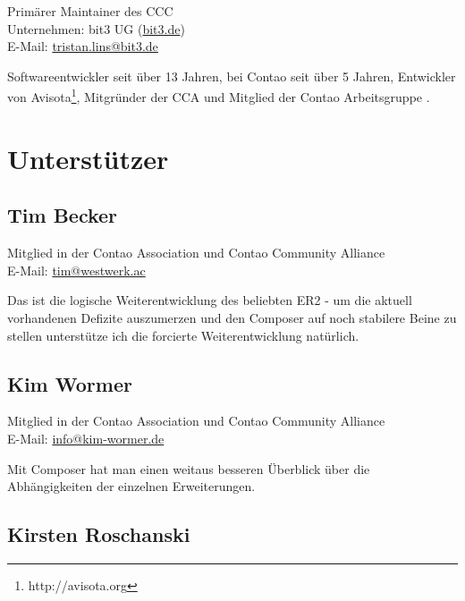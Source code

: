 \documentclass[
paper=a4,
draft=false,%
fontsize=10pt%
]{scrartcl}
\begin{document}
Primärer Maintainer des CCC \\
Unternehmen: bit3 UG (\href{https://bit3.de}{bit3.de}) \\
E-Mail: \href{mailto:tristan.lins@bit3.de}{tristan.lins@bit3.de}

Softwareentwickler seit über 13 Jahren, bei Contao seit über 5 Jahren, Entwickler von Avisota\footnote{http://avisota.org}, Mitgründer der CCA und Mitglied der Contao Arbeitsgruppe .

\newpage

%
%

\section{Unterstützer}
\label{sec:backers}

\subsection*{Tim  Becker}

Mitglied in der Contao Association und Contao Community Alliance \\
E-Mail: \href{mailto:tim@westwerk.ac}{tim@westwerk.ac}

Das  ist die logische Weiterentwicklung des beliebten ER2 - um die aktuell vorhandenen Defizite auszumerzen und den Composer auf noch stabilere Beine zu stellen unterstütze ich die forcierte Weiterentwicklung natürlich.

\subsection*{Kim  Wormer}

Mitglied in der Contao Association und Contao Community Alliance \\
E-Mail: \href{mailto:info@kim-wormer.de}{info@kim-wormer.de}

Mit Composer hat man einen weitaus besseren Überblick über die Abhängigkeiten der einzelnen Erweiterungen.

\subsection*{Kirsten  Roschanski}
\end{document}
